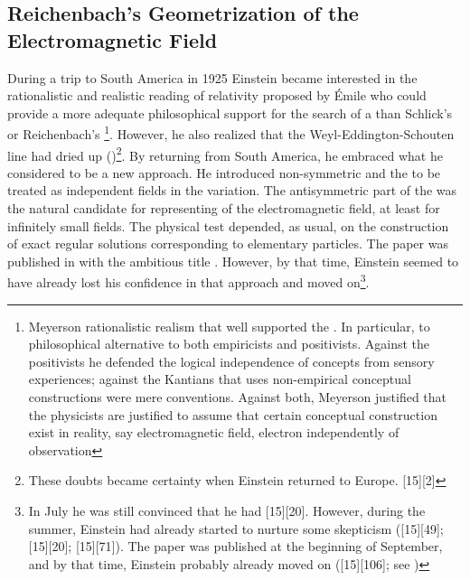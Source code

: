 \documentclass[draft]{article}
\begin{document}
\subsection{Reichenbach's Geometrization of the Electromagnetic Field}
%
During a trip to South America in 1925 Einstein became interested in the rationalistic and realistic reading of relativity proposed by \'Emile   who could provide a more adequate philosophical support for the search of a \uft than Schlick's or Reichenbach's \footnote{Meyerson rationalistic realism that well supported the \uftp. In particular, to philosophical alternative to both empiricists and positivists. Against the positivists he defended the logical independence of concepts from sensory experiences; against the Kantians that uses non-empirical  conceptual constructions were mere conventions. Against both, Meyerson justified that the physicists are justified to assume that certain conceptual construction exist in reality, say electromagnetic field, electron independently of observation}. However, he also realized that the Weyl-Eddington-Schouten line had dried up ()\footnote{These doubts became certainty when Einstein returned to Europe.  [15][2]}. By returning from South America, he embraced what he considered to be a new approach. He introduced non-symmetric \Gtmn and the \gmn to be treated as independent fields in the variation. The antisymmetric part of the \gmn was the natural candidate for representing of the electromagnetic field, at least for infinitely small fields. The physical test depended, as usual, on the construction of exact regular solutions corresponding to elementary particles. The paper was published in  with the ambitious title   \citep{Einstein1925}. However, by that time, Einstein seemed to have already lost his confidence in that approach and moved on\footnote{In July he was still convinced that he had  [15][20]. However, during the summer, Einstein had already started to nurture some skepticism ([15][49]; [15][20]; [15][71]). The paper was published at the beginning of September, and by that time, Einstein probably already moved on ([15][106]; see \cite{Einstein1927c})}.
\end{document}
